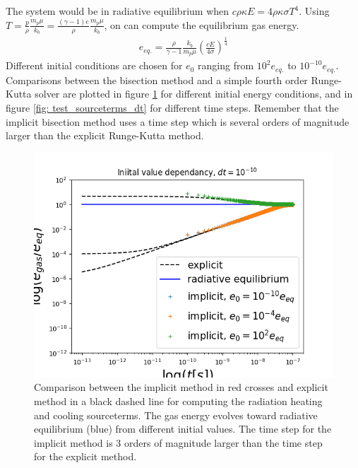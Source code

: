The system would be in radiative equilibrium when $c \rho \kappa E = 4 \rho \kappa \sigma T^4$. Using $T =  \frac{p}{\rho} \frac{m_p \mu}{k_b}= \frac{(\gamma - 1)e}{\rho} \frac{m_p \mu}{k_b}$, on can compute the equilibrium gas energy.
\begin{align}
e_{eq.} = \frac{\rho}{\gamma - 1} \frac{k_b}{m_p \mu}\left( \frac{c E}{4 \sigma} \right)^\frac{1}{4}
\end{align}
Different initial conditions are chosen for $e_0$ ranging from $10^2 e_{eq.}$ to $10^{-10} e_{eq.}$. Comparisons between the bisection method and a simple fourth order Runge-Kutta solver are plotted in figure \ref{fig: test_sourceterms} for different initial energy conditions, and in figure \ref{fig: test_sourceterms_dt} for different time steps. Remember that the implicit bisection method uses a time step which is several orders of magnitude larger than the explicit Runge-Kutta method.

\begin{figure}
\includegraphics[width = \textwidth]{test_sourceterms.png}
\caption{Comparison between the implicit method in red crosses and explicit method in a black dashed line for computing the radiation heating and cooling sourceterms. The gas energy evolves toward radiative equilibrium (blue) from different initial values. The time step for the implicit method is 3 orders of magnitude larger than the time step for the explicit method.}
\label{fig: test_sourceterms}
\end{figure}

